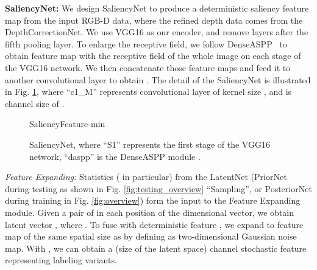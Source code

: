 \documentclass[10pt,twocolumn,letterpaper]{article}
\begin{document}
\noindent\textbf{SaliencyNet:}
We design SaliencyNet to produce a deterministic saliency feature map  from the input RGB-D data, where the refined depth data comes from the DepthCorrectionNet. We use VGG16 \cite{VGG} as our encoder, and remove layers after the fifth pooling layer. To enlarge the receptive field, we follow DenseASPP~\cite{denseaspp} to obtain feature map with the receptive field of the whole image on each stage of the VGG16 network. We then concatenate those feature maps and feed it to another convolutional layer to obtain
.
The detail of the SaliencyNet is illustrated in Fig. \ref{fig:saliency_feature_net}, where \enquote{c1\_M} represents convolutional layer of kernel size , and  is channel size of .









\begin{figure}[tbp]
	\centering
    \small
	\begin{overpic}[width=1.0\columnwidth]{SaliencyFeature-min}
    \end{overpic}
    \caption{SaliencyNet, where \enquote{S1} represents the first stage of the VGG16 network, \enquote{daspp} is the DenseASPP module \cite{denseaspp}.}
   \label{fig:saliency_feature_net}
   \vspace{-4mm}
\end{figure}


\noindent\textit{Feature Expanding:} Statistics ( in particular) from the LatentNet (PriorNet during testing as shown in Fig. \ref{fig:testing_overview} \enquote{Sampling}, or PosteriorNet during training in Fig. \ref{fig:overview}) form the input to 
the Feature Expanding module. Given a pair of  in each position of the  dimensional vector, we obtain latent vector , where . To fuse with deterministic feature , we expand  to feature map of the same spatial size as  by defining  as two-dimensional Gaussian noise map. With , we can obtain 
a 
(size of the latent space) 
channel stochastic feature  representing labeling variants.
\end{document}
